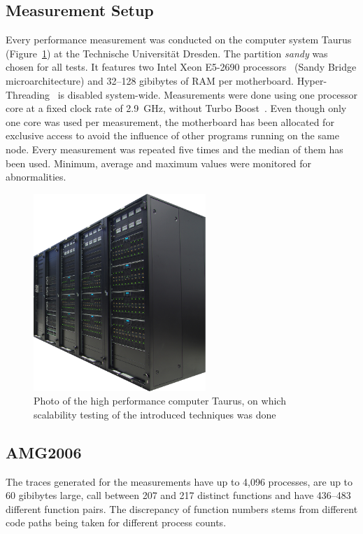 \documentclass[a4paper, final, diplominf]{zih-template}
\begin{document}
\subsection{Measurement Setup}
\label{sec:evaluation-scalability-measurement}
Every performance measurement was conducted on the computer system Taurus (Figure~\ref{fig:taurus}) at the Technische Universit\"at Dresden.
The partition \emph{sandy} was chosen for all tests.
It features two Intel Xeon E5-2690 processors~\cite{xeone52690} (Sandy Bridge microarchitecture) and 32--128 gibibytes of RAM per motherboard.
Hyper-Threading~\cite{hyperthreading} is disabled system-wide.
Measurements were done using one processor core at a fixed clock rate of 2.9~GHz, without Turbo Boost~\cite{turboboost}.
Even though only one core was used per measurement, the motherboard has been allocated for exclusive access to avoid the influence of other programs running on the same node.
Every measurement was repeated five times and the median of them has been used. Minimum, average and maximum values were monitored for abnormalities.
\begin{figure}[h!]
	\centering
	\includegraphics[width=6.5cm]{taurus}
	\caption{Photo of the high performance computer Taurus, on which scalability testing of the introduced techniques was done}
	\label{fig:taurus}
\end{figure}

\subsection{AMG2006}
\label{sec:evaluation-scalability-amg}
The traces generated for the measurements have up to 4,096 processes, are up to 60 gibibytes large, call between 207 and 217 distinct functions and have 436--483 different function pairs.
The discrepancy of function numbers stems from different code paths being taken for different process counts.
\end{document}
